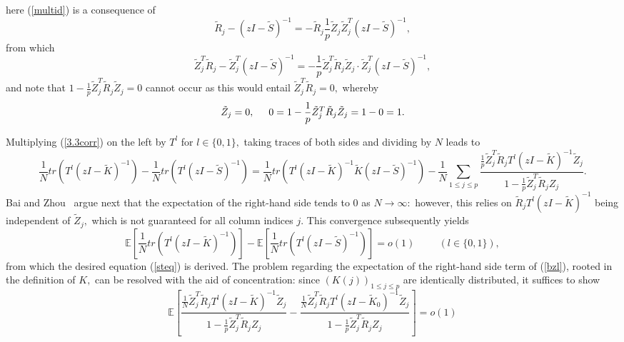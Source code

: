 \documentclass{article}
\numberwithin{equation}{section}
\begin{document}
here (\ref{multid}) is a consequence of
\[\tilde{R}_j-(zI-\tilde{S})^{-1}=-\tilde{R}_j\frac{1}{p}\tilde{Z}_j\tilde{Z}^T_j(zI-\tilde{S})^{-1},\]
from which
\[\tilde{Z}_j^T\tilde{R}_j-\tilde{Z}_j^T(zI-\tilde{S})^{-1}=-\frac{1}{p}\tilde{Z}_j^T\tilde{R}_j\tilde{Z}_j \cdot \tilde{Z}^T_j(zI-\tilde{S})^{-1},\]
and note that \(1-\frac{1}{p}\tilde{Z}_j^T\tilde{R}_j\tilde{Z}_j=0\) cannot occur as this would entail \(\tilde{Z}_j^T\tilde{R}_j=0,\) whereby 
\[\tilde{Z}_j=0, \hspace{0.5cm} 0=1-\frac{1}{p}\tilde{Z}_j^T\tilde{R}_j\tilde{Z}_j=1-0=1.\] 
\par
Multiplying (\ref{3.3corr}) on the left by \(T^l\) for \(l \in \{0,1\},\) taking traces of both sides and dividing by \(N\) leads to
\begin{equation}\tag{\(BZ_l\)}\label{bzl}
    \frac{1}{N}tr(T^l(zI-\tilde{K})^{-1})-\frac{1}{N}tr(T^l(zI-\tilde{S})^{-1})=\frac{1}{N}tr(T^l(zI-\tilde{K})^{-1}\tilde{K}(zI-\tilde{S})^{-1})-\frac{1}{N}\sum_{1 \leq j \leq p}{\frac{\frac{1}{p}\tilde{Z}_j^T\tilde{R}_jT^l(zI-\tilde{K})^{-1}\tilde{Z}_j}{1-\frac{1}{p}\tilde{Z}_j^T\tilde{R}_jZ_j}}.
\end{equation}
Bai and Zhou~\cite{baizhou} argue next that the expectation of the right-hand side tends to \(0\) as \(N \to \infty:\) however, this relies on \(\tilde{R}_jT^l(zI-\tilde{K})^{-1}\) being independent of \(\tilde{Z}_j,\) which is not guaranteed for all column indices \(j.\) %
This convergence subsequently yields
\[\mathbb{E}[\frac{1}{N}tr(T^l(zI-\tilde{K})^{-1})]-\mathbb{E}[\frac{1}{N}tr(T^l(zI-\tilde{S})^{-1})]=o(1) \hspace{1cm} (l \in \{0,1\}),\]
from which the desired equation (\ref{steq}) is derived. The problem regarding the expectation of the right-hand side term of (\ref{bzl}), rooted in the definition of \(K,\) can be resolved with the aid of concentration: since \((K(j))_{1 \leq j \leq p}\) are identically distributed, it suffices to show
\begin{equation}\label{fixbz}
    \mathbb{E}[\frac{\frac{1}{N}\tilde{Z}_j^T\tilde{R}_jT^l(zI-\tilde{K})^{-1}\tilde{Z}_j}{1-\frac{1}{p}\tilde{Z}_j^T\tilde{R}_jZ_j}-\frac{\frac{1}{N}\tilde{Z}_j^T\tilde{R}_jT^l(zI-\tilde{K}_0)^{-1}\tilde{Z}_j}{1-\frac{1}{p}\tilde{Z}_j^T\tilde{R}_jZ_j}]=o(1)
\end{equation}
\end{document}
